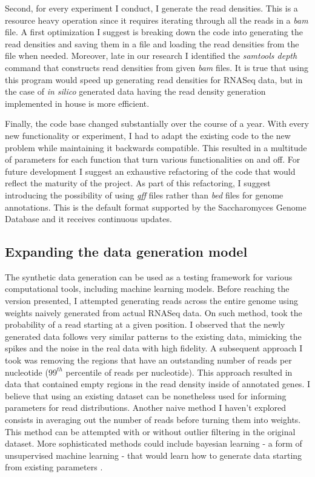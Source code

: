 \documentclass[12pt]{article}
\begin{document}
Second, for every experiment I conduct, I generate the read densities. This is a resource heavy operation since it requires iterating through all the reads in a \textit{bam} file. A first optimization I suggest is breaking down the code into generating the read densities and saving them in a file and loading the read densities from the file when needed. Moreover, late in our research I identified the \textit{samtools depth } command that constructs read densities from given \textit{bam} files. It is true that using this program would speed up generating read densities for RNASeq data, but in the case of \textit{in silico} generated data having the read density generation implemented in house is more efficient. 

Finally, the code base changed substantially over the course of a year. With every new functionality or experiment, I had to adapt the existing code to the new problem while maintaining it backwards compatible. This resulted in a multitude of parameters for each function that turn various functionalities on and off. For future development I suggest an exhaustive refactoring of the code that would reflect the maturity of the project. As part of this refactoring, I suggest introducing the possibility of using \textit{gff} files rather than \textit{bed} files for genome annotations. This is the default format supported by the Saccharomyces Genome Database and it receives continuous updates. 



\subsection{Expanding the data generation model}
The synthetic data generation can be used as a testing framework for various computational tools, including machine learning models. Before reaching the version presented, I attempted generating reads across the entire genome using weights naively generated from actual RNASeq data. On such method, took the probability of a read starting at a given position. I observed that the newly generated data follows very similar patterns to the existing data, mimicking the spikes and the noise in the real data with high fidelity. A subsequent approach I took was removing the regions that have an outstanding number of reads per nucleotide ($99^{th}$ percentile of reads per nucleotide). This approach resulted in data that contained empty regions in the read density inside of annotated genes. I believe that using an existing dataset can be nonetheless used for informing parameters for read distributions. Another naive method I haven't explored consists in averaging out the number of reads before turning them into weights. This method can be attempted with or without outlier filtering in the original dataset. More sophisticated methods could include bayesian learning - a form of unsupervised machine learning - that would learn how to generate data starting from existing parameters \cite{Sauta2020}.
\end{document}
